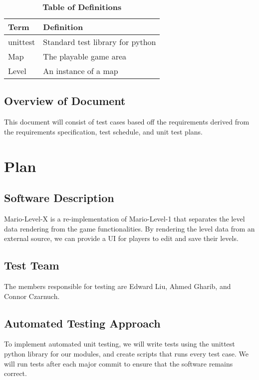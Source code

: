 \documentclass[12pt, titlepage]{article}
\begin{document}
\begin{table}[!htbp]
\caption{\textbf{Table of Definitions}} \label{Table}

\begin{tabularx}{\textwidth}{p{3cm}X}
\toprule
\textbf{Term} & \textbf{Definition}\\
\midrule
unittest & Standard test library for python\\
Map & The playable game area\\
Level & An instance of a map\\

\bottomrule
\end{tabularx}

\end{table}	

\subsection{Overview of Document}
This document will consist of test cases based off the requirements derived from the requirements specification, test schedule, and unit test plans.  

\section{Plan}
	
\subsection{Software Description}
Mario-Level-X is a re-implementation of Mario-Level-1 that separates the level data rendering from the game functionalities. By rendering the level data from an external source, we can provide a UI for players to edit and save their levels.

\subsection{Test Team}
The members responsible for testing are Edward Liu, Ahmed Gharib, and Connor Czarnuch.

\subsection{Automated Testing Approach}
To implement automated unit testing, we will write tests using the unittest python library for our modules, and create scripts that runs every test case. We will run tests after each major commit to ensure that the software remains correct.
\end{document}
